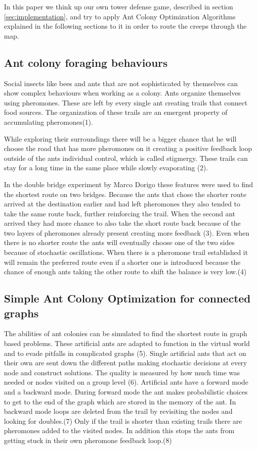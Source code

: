 In this paper we think up our own tower defense game, described in section \ref{sec:implementation}, and try to apply Ant Colony Optimization Algorithms explained in the following sections to it in order to route the creeps through the map.

\subsection{Ant colony foraging behaviours}

Social insects like bees and ants that are not sophisticated by themselves can show complex behaviours when working as a colony. Ants organize themselves using pheromones. These are left by every single ant creating trails that connect food sources. The organization of these trails are an emergent property of accumulating pheromones(1). 

While exploring their surroundings there will be a bigger chance that he will choose the road that has more pheromones on it creating a positive feedback loop outside of the ants individual control, which is called stigmergy. These trails can stay for a long time in the same place while slowly evaporating (2). 

In the double bridge experiment by Marco Dorigo these features were used to find the shortest route on two bridges. Because the ants that chose the shorter route arrived at the destination earlier and had left pheromones they also tended to take the same route back, further reinforcing the trail. When the second ant arrived they had more chance to also take the short route back because of the two layers of pheromones already present creating more feedback (3). Even when there is no shorter route the ants will eventually choose one of the two sides because of stochastic oscillations. When there is a pheromone trail established it will remain the preferred route even if a shorter one is introduced because the chance of enough ants taking the other route to shift the balance is very low.(4)

\subsection{Simple Ant Colony Optimization for connected graphs}

The abilities of ant colonies can be simulated to find the shortest route in graph based problems. These artificial ants are adapted to function in the virtual world and to evade pitfalls in complicated graphs (5).  
Single artificial ants that act on their own are sent down the different paths making stochastic decisions at every node and construct solutions. The quality is measured by how much time was needed or nodes visited on a group level (6). Artificial ants have a forward mode and a backward mode. During forward mode the ant makes probabilistic choices to get to the end of the graph which are stored in the memory of the ant. In backward mode loops are deleted from the trail by revisiting the nodes and looking for doubles.(7) Only if the trail is shorter than existing trails there are pheromones added to the visited nodes. In addition this stops the ants from getting stuck in their own pheromone feedback loop.(8) 

